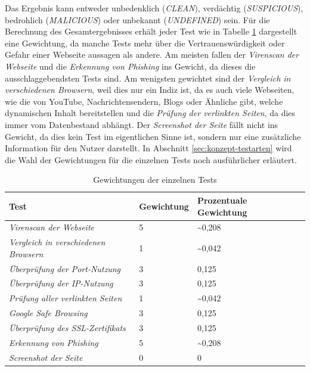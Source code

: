 Das Ergebnis kann entweder unbedenklich (\textit{CLEAN}), verdächtig (\textit{SUSPICIOUS}),
bedrohlich (\textit{MALICIOUS}) oder unbekannt (\textit{UNDEFINED}) sein. Für die Berechnung des
Gesamtergebnisses erhält jeder Test wie in Tabelle \ref{tbl:test-weights} dargestellt eine Gewichtung,
da manche Tests mehr über die Vertrauenswürdigkeit oder Gefahr einer Webseite aussagen als andere.
Am meisten fallen der \textit{Virenscan der Webseite} und die \textit{Erkennung von Phishing} ins
Gewicht, da dieses die ausschlaggebendsten Tests sind. Am wenigsten gewichtet sind der
\textit{Vergleich in verschiedenen Browsern}, weil dies nur ein Indiz ist, da es auch viele
Webseiten, wie die von YouTube, Nachrichtensendern, Blogs oder Ähnliche gibt, welche
dynamischen Inhalt bereitstellen und die \textit{Prüfung der verlinkten Seiten}, da dies immer vom
Datenbestand abhängt. Der \textit{Screenshot der Seite} fällt nicht ins Gewicht, da dies kein Test
im eigentlichen Sinne ist, sondern nur eine zusätzliche Information für den Nutzer darstellt. In
Abschnitt \ref{sec:konzept-testarten} wird die Wahl der Gewichtungen für die einzelnen Tests noch
ausführlicher erläutert.

\begin{table}[H]
\centering
\begin{tabular}{|l|l|l|l|}
\hline
\textbf{Test} & \textbf{Gewichtung} & \textbf{Prozentuale Gewichtung} \\\hline
\textit{Virenscan der Webseite} & 5 & \textasciitilde0,208\\\hline
\textit{Vergleich in verschiedenen Browsern} & 1 & \textasciitilde0,042\\\hline
\textit{Überprüfung der Port-Nutzung} & 3 & 0,125\\\hline
\textit{Überprüfung der IP-Nutzung} & 3 & 0,125\\\hline
\textit{Prüfung aller verlinkten Seiten} & 1 & \textasciitilde0,042\\\hline
\textit{Google Safe Browsing} & 3 & 0,125\\\hline
\textit{Überprüfung des SSL-Zertifikats} & 3 & 0,125\\\hline
\textit{Erkennung von Phishing} & 5 & \textasciitilde0,208\\\hline
\textit{Screenshot der Seite} & 0 & 0\\\hline
\end{tabular}
\caption{Gewichtungen der einzelnen Tests}
\label{tbl:test-weights}
\end{table}

